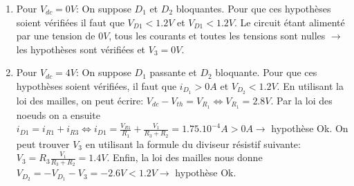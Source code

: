 \documentclass{../../template/tp}
\begin{document}
{
    \begin{enumerate}
    \item Pour $V_{dc} = 0V$:  On suppose $D_1$ et $D_2$ bloquantes. Pour que ces hypothèses soient vérifiées il faut que $V_{D1} < 1.2 V$ et $V_{D1} < 1.2 V$. Le circuit étant alimenté par une tension de $0V$, tous les courants et toutes les tensions sont nulles $\longrightarrow$ les hypothèses sont vérifiées et $V_{3} = 0V $. 
  
    \item Pour $V_{dc} = 4V$:
    On suppose $D_1$ passante et $D_2$ bloquante. Pour que ces hypothèses soient vérifiées, il faut que $i_{D_1} > 0A$ et $V_{D_2} < 1.2V$. En utilisant la loi des mailles, on peut écrire: $V_{dc} - V_{th} =V_{R_1} \Leftrightarrow V_{R_1} = 2.8V$. Par la loi des noeuds on a ensuite $i_{D1} = i_{R1} + i_{R3} \Leftrightarrow
    i_{D1} =  \frac{V_{R1}}{R_1} + \frac{V_1}{R_3+R_2} = 1.75.10^{-4}A > 0A \longrightarrow$ hypothèse Ok. On peut trouver $V_3$ en utilisant la formule du diviseur résistif suivante: $V_3 = R_3 \frac{V_1}{R_3+R_2}= 1.4V$. Enfin, la loi des mailles nous donne $V_{D_2} = -V_{D_1} - V_3 = -2.6V < 1.2V \longrightarrow$ hypothèse Ok.
\end{enumerate}
}
\end{document}
